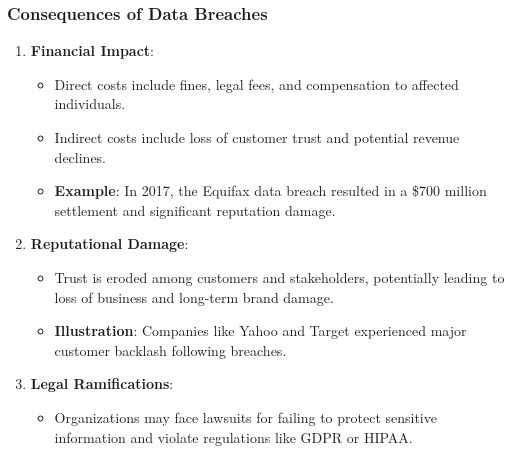 \documentclass[aspectratio=169]{beamer}
\begin{document}
\begin{frame}[fragile]
    \frametitle{Consequences of Data Breaches}
    \begin{enumerate}
        \item \textbf{Financial Impact}:
            \begin{itemize}
                \item Direct costs include fines, legal fees, and compensation to affected individuals.
                \item Indirect costs include loss of customer trust and potential revenue declines.
                \item \textbf{Example}: In 2017, the Equifax data breach resulted in a \$700 million settlement and significant reputation damage.
            \end{itemize}
        
        \item \textbf{Reputational Damage}:
            \begin{itemize}
                \item Trust is eroded among customers and stakeholders, potentially leading to loss of business and long-term brand damage.
                \item \textbf{Illustration}: Companies like Yahoo and Target experienced major customer backlash following breaches.
            \end{itemize}
        
        \item \textbf{Legal Ramifications}:
            \begin{itemize}
                \item Organizations may face lawsuits for failing to protect sensitive information and violate regulations like GDPR or HIPAA.
            \end{itemize}
    \end{enumerate}
\end{frame}
\end{document}
